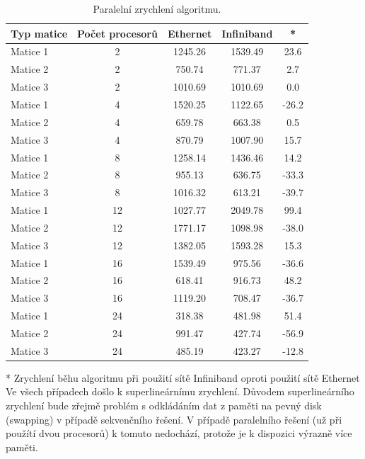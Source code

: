 \documentclass[12pt]{article}
\begin{document}
\begin{table}[ht]
\centering
\begin{tabular}{|l|c|c|c|c|}
\hline \textbf{Typ matice} & \textbf{Počet procesorů} & \textbf{Ethernet} & \textbf{Infiniband} & * \\
\hline 
\hline Matice 1 & 2 & 1245.26 & 1539.49 & 23.6 \\ 
\hline Matice 2 & 2 & 750.74 & 771.37 & 2.7 \\ 
\hline Matice 3 & 2 & 1010.69 & 1010.69 & 0.0 \\ 
\hline
\hline Matice 1 & 4 & 1520.25 & 1122.65 & -26.2 \\ 
\hline Matice 2 & 4 & 659.78 & 663.38 & 0.5 \\ 
\hline Matice 3 & 4 & 870.79 & 1007.90 & 15.7 \\ 
\hline 
\hline Matice 1 & 8 & 1258.14 & 1436.46 & 14.2 \\ 
\hline Matice 2 & 8 & 955.13 & 636.75 & -33.3 \\ 
\hline Matice 3 & 8 & 1016.32 & 613.21 & -39.7 \\ 
\hline 
\hline Matice 1 & 12 & 1027.77 & 2049.78 & 99.4 \\ 
\hline Matice 2 & 12 & 1771.17 & 1098.98 & -38.0 \\ 
\hline Matice 3 & 12 & 1382.05 & 1593.28 & 15.3 \\ 
\hline 
\hline Matice 1 & 16 & 1539.49 & 975.56 & -36.6 \\ 
\hline Matice 2 & 16 & 618.41 & 916.73 & 48.2 \\ 
\hline Matice 3 & 16 & 1119.20 & 708.47 & -36.7 \\ 
\hline 
\hline Matice 1 & 24 & 318.38 & 481.98 & 51.4 \\ 
\hline Matice 2 & 24 & 991.47 & 427.74 & -56.9 \\ 
\hline Matice 3 & 24 & 485.19 & 423.27 & -12.8 \\ 
\hline 
\end{tabular}
\caption{Paralelní zrychlení algoritmu.}
\label{paralelni_zrychleni}
\end{table}
* Zrychlení běhu algoritmu při použití sítě Infiniband oproti použití sítě Ethernet
\\

Ve všech případech došlo k superlineárnímu zrychlení. Důvodem superlineárního zrychlení bude zřejmě problém s odkládáním dat z paměti na pevný disk (swapping) v případě sekvenčního řešení. V případě paralelního řešení (už při použítí dvou procesorů) k tomuto nedochází, protože je k dispozici výrazně více paměti.
\end{document}
